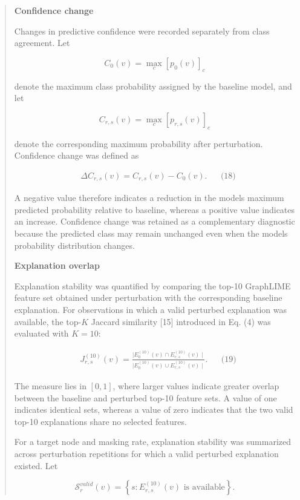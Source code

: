 \documentclass[a4paper]{article}
\begin{document}
\begin{quote}
\textbf{Confidence change}

Changes in predictive confidence were recorded separately from class
agreement. Let

\[C_{0}(v) = \max_{c}\left\lbrack p_{0}(v) \right\rbrack_{c}
\]

denote the maximum class probability assigned by the baseline model, and
let

\[C_{r,s}(v) = \max_{c}\left\lbrack p_{r,s}(v) \right\rbrack_{c}
\]

denote the corresponding maximum probability after perturbation.
Confidence change was defined as

\[\begin{matrix}
 & \Delta C_{r,s}(v) = C_{r,s}(v) - C_{0}(v). & & \text{(18)}
\end{matrix}
\]

A negative value therefore indicates a reduction in the
model\textquotesingle s maximum predicted probability relative to
baseline, whereas a positive value indicates an increase. Confidence
change was retained as a complementary diagnostic because the predicted
class may remain unchanged even when the model\textquotesingle s
probability distribution changes.

\textbf{Explanation overlap}

Explanation stability was quantified by comparing the top-10 GraphLIME
feature set obtained under perturbation with the corresponding baseline
explanation. For observations in which a valid perturbed explanation was
available, the top-\(K\) Jaccard similarity {[}15{]} introduced in Eq.
(4) was evaluated with \(K = 10\):

\[\begin{matrix}
 & J_{r,s}^{(10)}(v) = \frac{\left. \mid E_{0}^{(10)}(v) \cap E_{r,s}^{(10)}(v) \right.\mid}{\left. \mid E_{0}^{(10)}(v) \cup E_{r,s}^{(10)}(v) \right.\mid}. & & \text{(19)}
\end{matrix}
\]

The measure lies in \(\left\lbrack 0,1 \right\rbrack\), where larger
values indicate greater overlap between the baseline and perturbed
top-10 feature sets. A value of one indicates identical sets, whereas a
value of zero indicates that the two valid top-10 explanations share no
selected features.

For a target node and masking rate, explanation stability was summarized
across perturbation repetitions for which a valid perturbed explanation
existed. Let

\[\mathcal{S}_{r}^{valid}(v) = \left\{ s:E_{r,s}^{(10)}(v)\text{~is~available} \right\}.
\]


\end{quote}
\end{document}
